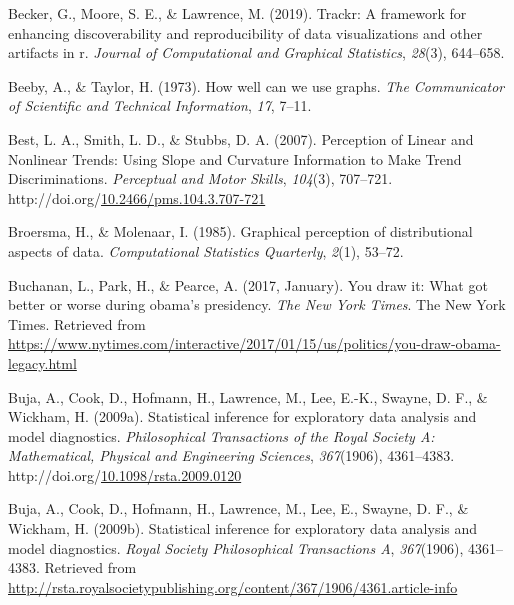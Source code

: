 \documentclass[print]{nuthesis}
\newlength{\cslhangindent}
\newenvironment{CSLReferences}%
{\setlength{\parindent}{0pt}%
\everypar{\setlength{\hangindent}{\cslhangindent}}\ignorespaces}%
{\par}
\begin{document}
\begin{CSLReferences}{1}{0}
\leavevmode{}%
Becker, G., Moore, S. E., \& Lawrence, M. (2019). Trackr: A framework for enhancing discoverability and reproducibility of data visualizations and other artifacts in r. \emph{Journal of Computational and Graphical Statistics}, \emph{28}(3), 644--658.

\leavevmode{}%
Beeby, A., \& Taylor, H. (1973). How well can we use graphs. \emph{The Communicator of Scientific and Technical Information}, \emph{17}, 7--11.

\leavevmode{}%
Best, L. A., Smith, L. D., \& Stubbs, D. A. (2007). Perception of {Linear} and {Nonlinear} {Trends}: {Using} {Slope} and {Curvature} {Information} to {Make} {Trend} {Discriminations}. \emph{Perceptual and Motor Skills}, \emph{104}(3), 707--721. http://doi.org/\href{https://doi.org/10.2466/pms.104.3.707-721}{10.2466/pms.104.3.707-721}

\leavevmode{}%
Broersma, H., \& Molenaar, I. (1985). Graphical perception of distributional aspects of data. \emph{Computational Statistics Quarterly}, \emph{2}(1), 53--72.

\leavevmode{}%
Buchanan, L., Park, H., \& Pearce, A. (2017, January). You draw it: What got better or worse during obama's presidency. \emph{The New York Times}. The New York Times. Retrieved from \url{https://www.nytimes.com/interactive/2017/01/15/us/politics/you-draw-obama-legacy.html}

\leavevmode{}%
Buja, A., Cook, D., Hofmann, H., Lawrence, M., Lee, E.-K., Swayne, D. F., \& Wickham, H. (2009a). Statistical inference for exploratory data analysis and model diagnostics. \emph{Philosophical Transactions of the Royal Society A: Mathematical, Physical and Engineering Sciences}, \emph{367}(1906), 4361--4383. http://doi.org/\href{https://doi.org/10.1098/rsta.2009.0120}{10.1098/rsta.2009.0120}

\leavevmode{}%
Buja, A., Cook, D., Hofmann, H., Lawrence, M., Lee, E., Swayne, D. F., \& Wickham, H. (2009b). Statistical inference for exploratory data analysis and model diagnostics. \emph{Royal Society Philosophical Transactions A}, \emph{367}(1906), 4361--4383. Retrieved from \url{http://rsta.royalsocietypublishing.org/content/367/1906/4361.article-info}


\end{CSLReferences}
\end{document}

